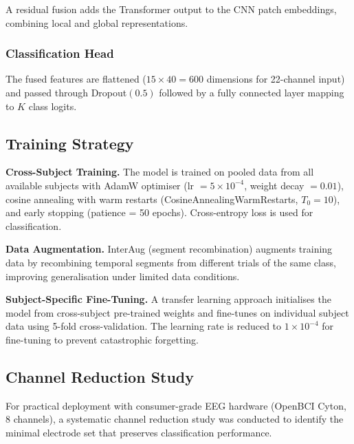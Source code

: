 \documentclass[12pt, a4paper]{article}
\begin{document}
A residual fusion adds the Transformer output to the CNN patch embeddings, combining local and global representations.

\subsubsection{Classification Head}

The fused features are flattened ($15 \times 40 = 600$ dimensions for 22-channel input) and passed through Dropout$(0.5)$ followed by a fully connected layer mapping to $K$ class logits.

\subsection{Training Strategy}

\textbf{Cross-Subject Training.} The model is trained on pooled data from all available subjects with AdamW optimiser (lr $= 5 \times 10^{-4}$, weight decay $= 0.01$), cosine annealing with warm restarts (CosineAnnealingWarmRestarts, $T_0 = 10$), and early stopping (patience = 50 epochs). Cross-entropy loss is used for classification.

\textbf{Data Augmentation.} InterAug (segment recombination) augments training data by recombining temporal segments from different trials of the same class, improving generalisation under limited data conditions.

\textbf{Subject-Specific Fine-Tuning.} A transfer learning approach initialises the model from cross-subject pre-trained weights and fine-tunes on individual subject data using 5-fold cross-validation. The learning rate is reduced to $1 \times 10^{-4}$ for fine-tuning to prevent catastrophic forgetting.

\subsection{Channel Reduction Study}

For practical deployment with consumer-grade EEG hardware (OpenBCI Cyton, 8 channels), a systematic channel reduction study was conducted to identify the minimal electrode set that preserves classification performance.
\end{document}
